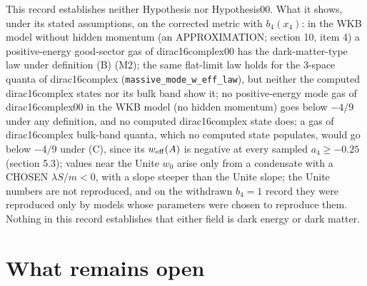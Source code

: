 \documentclass[11pt]{article}
\begin{document}
This record establishes neither Hypothesis nor Hypothesis00. What it shows, under its stated assumptions, on the corrected metric with $b_4(x_4)$: in the WKB model without hidden momentum (an APPROXIMATION; section 10, item 4) a positive-energy good-sector gas of dirac16complex00 has the dark-matter-type law under definition (B) (M2); the same flat-limit law holds for the 3-space quanta of dirac16complex (\texttt{massive\_\allowbreak{}mode\_w\_e\allowbreak{}ff\_law}), but neither the computed dirac16complex states nor its bulk band show it; no positive-energy mode gas of dirac16complex00 in the WKB model (no hidden momentum) goes below $-4/9$ under any definition, and no computed dirac16complex state does; a gas of dirac16complex bulk-band quanta, which no computed state populates, would go below $-4/9$ under (C), since its $w_{\rm eff}(A)$ is negative at every sampled $a_4 \geq -0.25$ (section 5.3); values near the Unite $w_0$ arise only from a condensate with a CHOSEN $\lambda S/m < 0$, with a slope steeper than the Unite slope; the Unite numbers are not reproduced, and on the withdrawn $b_4 = 1$ record they were reproduced only by models whose parameters were chosen to reproduce them. Nothing in this record establishes that either field is dark energy or dark matter.

\section{What remains open}
\end{document}
